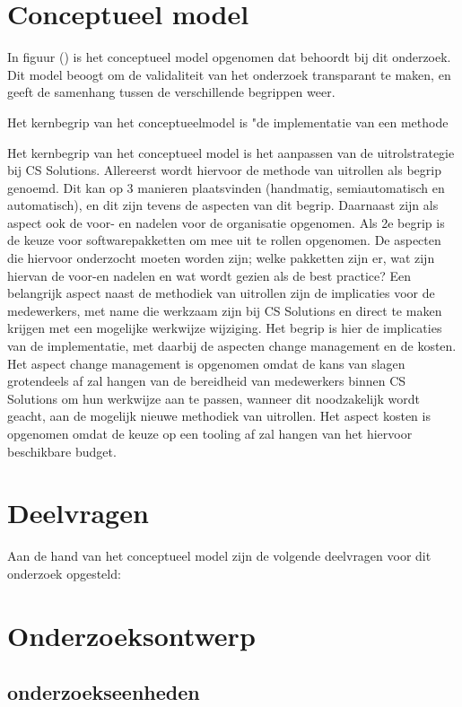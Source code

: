 \section{Conceptueel model}\label{sec:conceptueel-model}
In figuur () is het conceptueel model opgenomen dat behoordt bij dit onderzoek. Dit model beoogt om de validaliteit van het onderzoek transparant te maken, en geeft de samenhang tussen de verschillende begrippen weer.

Het kernbegrip van het conceptueelmodel is "de implementatie van een methode

Het kernbegrip van het conceptueel model is het aanpassen van de uitrolstrategie bij CS Solutions. Allereerst wordt hiervoor de methode van uitrollen als begrip genoemd. Dit kan op 3 manieren plaatsvinden (handmatig, semiautomatisch en automatisch), en dit zijn tevens de aspecten van dit begrip. Daarnaast zijn als aspect ook de voor- en nadelen voor de organisatie opgenomen. Als 2e begrip is de keuze voor softwarepakketten om mee uit te rollen opgenomen. De aspecten die hiervoor onderzocht moeten worden zijn; welke pakketten zijn er, wat zijn hiervan de voor-en nadelen en wat wordt gezien als de best practice?
Een belangrijk aspect naast de methodiek van uitrollen zijn de implicaties voor de medewerkers, met name die werkzaam zijn bij CS Solutions en direct te maken krijgen met een mogelijke werkwijze wijziging. Het begrip is hier de implicaties van de implementatie, met daarbij de aspecten change management en de kosten. Het aspect change management is opgenomen omdat de kans van slagen grotendeels af zal hangen van de bereidheid van medewerkers binnen CS Solutions om hun werkwijze aan te passen, wanneer dit noodzakelijk wordt geacht, aan de mogelijk nieuwe methodiek van uitrollen. Het aspect kosten is opgenomen omdat de keuze op een tooling af zal hangen van het hiervoor beschikbare budget.

\section{Deelvragen}\label{sec:deelvragen}
Aan de hand van het conceptueel model zijn de volgende deelvragen voor dit onderzoek opgesteld:



\section{Onderzoeksontwerp}\label{sec:onderzoeksontwerp}
\subsection{onderzoekseenheden}\label{subsec:onderzoekseenheden}

